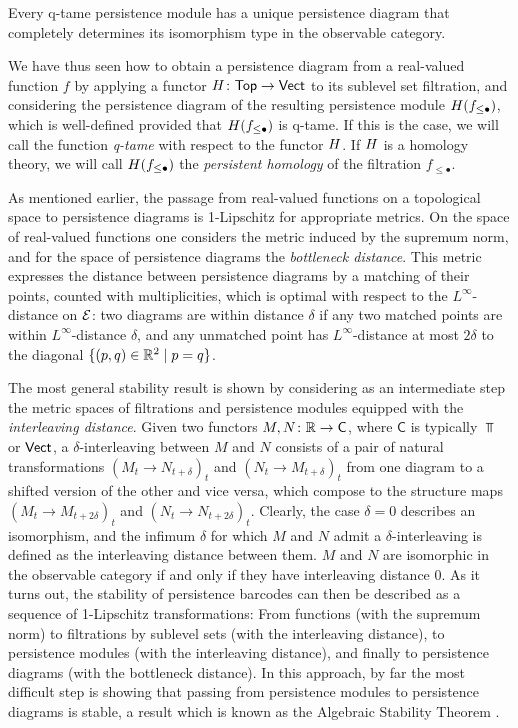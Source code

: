 \begin{thm} \label{t:q-tame modules have barcodes}
	Every q-tame persistence module has a unique persistence diagram that completely determines its isomorphism type in the observable category.
\end{thm}

We have thus seen how to obtain a persistence diagram from a real-valued function $f$ by applying a functor $H \colon \mathsf{Top} \to \mathsf{Vect}$ to its sublevel set filtration, and considering the persistence diagram of the resulting persistence module $H(f_{\leq \bullet})$, which is well-defined provided that $H(f_{\leq \bullet})$ is q-tame.
If this is the case, we will call the function \emph{q-tame} with respect to the functor $H$.
If $H$ is a homology theory, we will call $H(f_{\leq \bullet})$ the \emph{persistent homology} of the filtration $f_{\leq \bullet}$.

As mentioned earlier, the passage from real-valued functions on a topological space to persistence diagrams is 1-Lipschitz for appropriate metrics.
On the space of real-valued functions one considers the metric induced by the supremum norm, and for the space of persistence diagrams the \emph{bottleneck distance}.
This metric expresses the distance between persistence diagrams by a matching of their points, counted with multiplicities, which is optimal with respect to the $L^{\infty}$-distance on $\mathcal{E}$: two diagrams are within distance $\delta$ if any two matched points are within $L^{\infty}$-distance $\delta$, and any unmatched point has $L^{\infty}$-distance at most $2\delta$ to the diagonal $\{(p,q) \in \mathbb{R}^2 \mid p = q\}$.

The most general stability result is shown by considering as an intermediate step the metric spaces of filtrations and persistence modules equipped with the \emph{interleaving distance}.
Given two functors $M,N \colon \mathbb{R} \to \mathsf C$, where $\mathsf C$ is typically $\Top$ or $\mathsf{Vect}$, a $\delta$-interleaving between $M$ and $N$ consists of a pair of natural transformations $(M_t \to N_{t+\delta})_t$ and $(N_t \to M_{t+\delta})_t$ from one diagram to a shifted version of the other and vice versa, which compose to the structure maps $(M_t \to M_{t+2\delta})_t$ and $(N_t \to N_{t+2\delta})_t$.
Clearly, the case $\delta=0$ describes an isomorphism, and the infimum $\delta$ for which $M$ and $N$ admit a $\delta$-interleaving is defined as the interleaving distance between them.
$M$ and $N$ are isomorphic in the observable category if and only if they have interleaving distance $0$.
As it turns out, the stability of persistence barcodes can then be described as a sequence of 1-Lipschitz transformations: From functions (with the supremum norm) to filtrations by sublevel sets (with the interleaving distance), to persistence modules (with the interleaving distance), and finally to persistence diagrams (with the bottleneck distance).
In this approach, by far the most difficult step is showing that passing from persistence modules to persistence diagrams is stable, a result which is known as the Algebraic Stability Theorem \cite{Chazal.2009, Bauer.2015, Chazal.2016a}.

